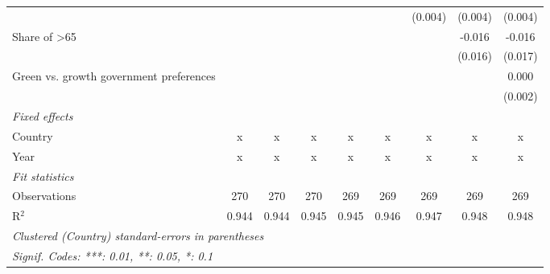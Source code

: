 \begin{table}[htbp]
\begin{tabular}{lcccccccc}
                                                     &         &         &         &         &         & (0.004) & (0.004) & (0.004)\\   
      Share of >65                                   &         &         &         &         &         &         & -0.016  & -0.016\\   
                                                     &         &         &         &         &         &         & (0.016) & (0.017)\\   
      Green vs. growth government preferences        &         &         &         &         &         &         &         & 0.000\\   
                                                     &         &         &         &         &         &         &         & (0.002)\\   
      \emph{Fixed effects}\\
      Country                                        & x       & x       & x       & x       & x       & x       & x       & x\\  
      Year                                           & x       & x       & x       & x       & x       & x       & x       & x\\  
      \midrule \emph{Fit statistics}\\
      Observations                                   & 270     & 270     & 270     & 269     & 269     & 269     & 269     & 269\\  
      R$^2$                                          & 0.944   & 0.944   & 0.945   & 0.945   & 0.946   & 0.947   & 0.948   & 0.948\\  
      \midrule
      \multicolumn{9}{l}{\emph{Clustered (Country) standard-errors in parentheses}}\\
      \multicolumn{9}{l}{\emph{Signif. Codes: ***: 0.01, **: 0.05, *: 0.1}}\\
   \end{tabular}
\end{table}


